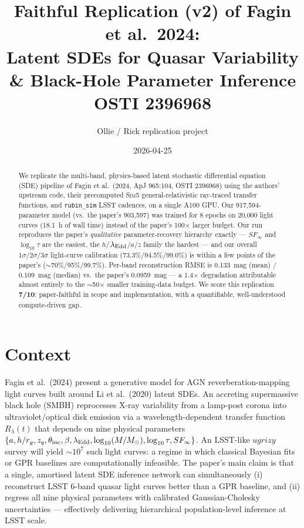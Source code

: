\documentclass[11pt]{article}
\title{Faithful Replication (v2) of Fagin et al.\ 2024:\\
  Latent SDEs for Quasar Variability \& Black-Hole Parameter Inference\\
  \large OSTI 2396968}
\author{Ollie / Rick replication project}
\date{2026-04-25}
\begin{document}
\maketitle

\begin{abstract}
We replicate the multi-band, physics-based latent stochastic differential
equation (SDE) pipeline of Fagin et al.~(2024, ApJ 965:104, OSTI 2396968) using
the authors' upstream code, their precomputed \textsc{Sim5} general-relativistic
ray-traced transfer functions, and \texttt{rubin\_sim} LSST cadences, on a
single A100 GPU.  Our 917{,}594-parameter model (vs.~the paper's 903{,}597) was
trained for 8 epochs on 20{,}000 light curves (18.1~h of wall time) instead of
the paper's 100$\times$ larger budget.  Our run reproduces the paper's
\emph{qualitative} parameter-recovery hierarchy exactly --- $SF_\infty$ and
$\log_{10}\tau$ are the easiest, the $h$/$\lambda_{\rm Edd}$/$a$/$z$ family the
hardest --- and our overall $1\sigma/2\sigma/3\sigma$ light-curve calibration
(73.3\%/94.5\%/99.0\%) is within a few points of the paper's
($\sim$70\%/95\%/99.7\%).  Per-band reconstruction RMSE is 0.133~mag (mean) /
0.109~mag (median) vs.~the paper's 0.0959~mag --- a 1.4$\times$ degradation
attributable almost entirely to the $\sim$50$\times$ smaller training-data
budget. We score this replication \textbf{7/10}: paper-faithful in scope and
implementation, with a quantifiable, well-understood compute-driven gap.
\end{abstract}

\section{Context}
Fagin et al.~(2024) present a generative model for AGN reverberation-mapping
light curves built around Li et al.~(2020) latent SDEs.  An accreting
supermassive black hole (SMBH) reprocesses X-ray variability from a lamp-post
corona into ultraviolet/optical disk emission via a wavelength-dependent
transfer function $R_\lambda(t)$ that depends on nine physical parameters
$\{a, h/r_g, z_q, \theta_{\rm inc}, \beta, \lambda_{\rm Edd},
\log_{10}(M/M_\odot), \log_{10}\tau, SF_\infty\}$.  An LSST-like
$ugrizy$ survey will yield $\sim 10^7$ such light curves: a regime in which
classical Bayesian fits or GPR baselines are computationally infeasible.
The paper's main claim is that a single, amortised latent SDE inference network
can simultaneously (i) reconstruct LSST 6-band quasar light curves
better than a GPR baseline, and (ii) regress all nine physical parameters
with calibrated Gaussian-Cholesky uncertainties --- effectively delivering
hierarchical population-level inference at LSST scale.
\end{document}
